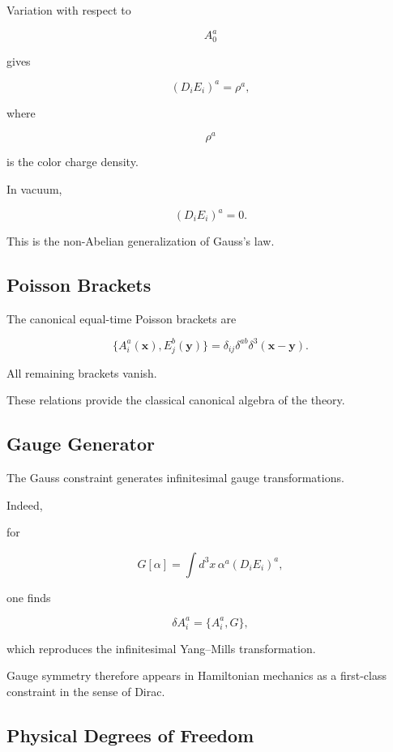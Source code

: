 Variation with respect to

\[
A_0^a
\]

gives

\[
\boxed{
(D_iE_i)^a
=
\rho^a,
}
\]

where

\[
\rho^a
\]

is the color charge density.

In vacuum,

\[
(D_iE_i)^a=0.
\]

This is the non-Abelian generalization of Gauss's law.


\subsection{Poisson Brackets}

The canonical equal-time Poisson brackets are

\[
\boxed{
\{
A_i^a(\mathbf x),
E_j^b(\mathbf y)
\}
=
\delta_{ij}
\delta^{ab}
\delta^3(\mathbf x-\mathbf y).
}
\]

All remaining brackets vanish.

These relations provide the classical canonical algebra of the theory.


\subsection{Gauge Generator}

The Gauss constraint generates infinitesimal gauge transformations.

Indeed,

for

\[
G[\alpha]
=
\int
d^3x\,
\alpha^a
(D_iE_i)^a,
\]

one finds

\[
\delta A_i^a
=
\{
A_i^a,
G
\},
\]

which reproduces the infinitesimal Yang--Mills transformation.

Gauge symmetry therefore appears in Hamiltonian mechanics as a first-class
constraint in the sense of Dirac.


\subsection{Physical Degrees of Freedom}

